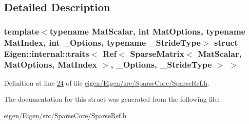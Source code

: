 \subsection{Detailed Description}
\subsubsection*{template$<$typename Mat\+Scalar, int Mat\+Options, typename Mat\+Index, int \+\_\+\+Options, typename \+\_\+\+Stride\+Type$>$\newline
struct Eigen\+::internal\+::traits$<$ Ref$<$ Sparse\+Matrix$<$ Mat\+Scalar, Mat\+Options, Mat\+Index $>$, \+\_\+\+Options, \+\_\+\+Stride\+Type $>$ $>$}



Definition at line \hyperlink{eigen_2_eigen_2src_2_sparse_core_2_sparse_ref_8h_source_l00024}{24} of file \hyperlink{eigen_2_eigen_2src_2_sparse_core_2_sparse_ref_8h_source}{eigen/\+Eigen/src/\+Sparse\+Core/\+Sparse\+Ref.\+h}.



The documentation for this struct was generated from the following file\+:\begin{DoxyCompactItemize}
\item 
eigen/\+Eigen/src/\+Sparse\+Core/\+Sparse\+Ref.\+h\end{DoxyCompactItemize}

